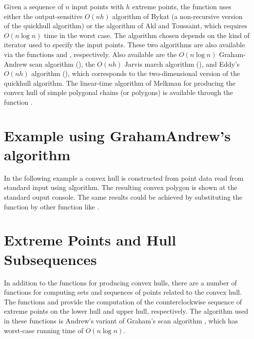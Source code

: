 Given a sequence of $n$ input points with $h$ extreme points,
the function 
uses either the output-sensitive $O(n h)$ algorithm of Bykat \cite{b-chfsp-78}
(a non-recursive version of the quickhull \cite{bdh-qach-96} algorithm)%
or the algorithm of Akl and Toussaint, which requires $O(n \log n)$ time
in the worst case.  The algorithm chosen depends on the kind of 
iterator used to specify the input points.  These two algorithms are
also available via the functions  and ,
respectively.  Also available are 
the $O(n \log n)$ Graham-Andrew scan algorithm \cite{a-aeach-79,m-mdscg-84} 
(), 
the $O(n h)$ Jarvis march algorithm \cite{j-ichfs-73}
(),
and Eddy's $O(n h)$ algorithm \cite{e-nchap-77}
(), which corresponds to the 
two-dimensional version of the quickhull algorithm.
The linear-time algorithm of Melkman for producing the convex hull of 
simple polygonal chains (or polygons) is available through the function
.%

\section{Example using GrahamAndrew's algorithm}

In the following example a convex hull is constructed from point data read 
from standard input using  algorithm. The resulting convex 
polygon is shown at the standard ouput console. The same results could be 
achieved by substituting the function  by other 
function like .



\section{Extreme Points and Hull Subsequences}
In addition to the functions for producing convex hulls, there are a
number of functions for computing sets and sequences of points related
to the convex hull.  
The functions 
and 
provide the computation of the counterclockwise 
sequence of extreme points on the lower hull and upper hull,
respectively.  The algorithm used in these functions is
Andrew's variant of Graham's scan algorithm \cite{a-aeach-79,m-mdscg-84},
which has worst-case running time of $O(n \log n)$.


